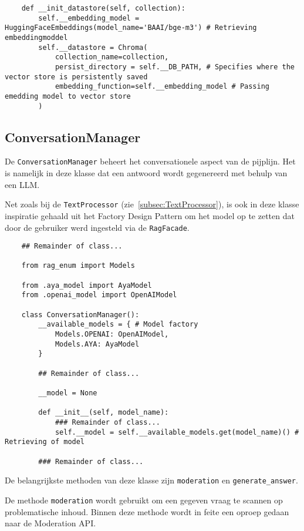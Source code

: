 \begin{verbatim}
    def __init_datastore(self, collection):
        self.__embedding_model = HuggingFaceEmbeddings(model_name='BAAI/bge-m3') # Retrieving embeddingmoddel
        self.__datastore = Chroma(
            collection_name=collection,
            persist_directory = self.__DB_PATH, # Specifies where the vector store is persistently saved
            embedding_function=self.__embedding_model # Passing emedding model to vector store
        )
\end{verbatim}


\subsection{ConversationManager}%
\label{subsec:ConversationManager}

De \texttt{ConversationManager} beheert het conversationele aspect van de pijplijn. Het is namelijk in deze klasse dat een antwoord wordt gegenereerd met behulp van een \acrshort{LLM}.

Net zoals bij de \texttt{TextProcessor} (zie~\ref{subsec:TextProcessor}), is ook in deze klasse inspiratie gehaald uit het Factory Design Pattern om het model op te zetten dat door de gebruiker werd ingesteld via de \texttt{RagFacade}.

\begin{verbatim}
    ## Remainder of class...
    
    from rag_enum import Models
    
    from .aya_model import AyaModel
    from .openai_model import OpenAIModel
    
    class ConversationManager():
        __available_models = { # Model factory
            Models.OPENAI: OpenAIModel, 
            Models.AYA: AyaModel
        }
        
        ## Remainder of class... 
        
        __model = None
    
        def __init__(self, model_name):
            ### Remainder of class...
            self.__model = self.__available_models.get(model_name)() # Retrieving of model
            
        ### Remainder of class...
\end{verbatim}

De belangrijkste methoden van deze klasse zijn \texttt{moderation} en \texttt{generate\_answer}.

De methode \texttt{moderation} wordt gebruikt om een gegeven vraag te scannen op problematische inhoud. Binnen deze methode wordt in feite een oproep gedaan naar de Moderation API.

